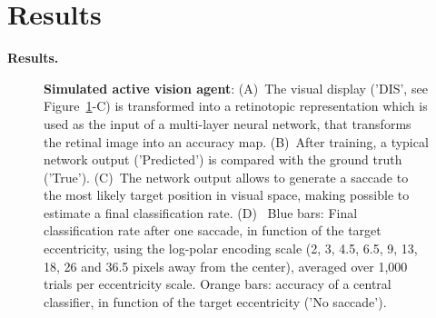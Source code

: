 \CNS
\section{Results}
\label{sec:results}
\else
\textbf{Results. }
\fi
\begin{figure}%
\caption{
{\bf Simulated active vision agent}: 
(A)~The visual display ('DIS', see  Figure~\ref{fig:results}-C)  is transformed into a retinotopic representation which is used as the input of a multi-layer neural network, that transforms the retinal image into an accuracy map. (B)~After training, a typical network output  ('Predicted') is compared  with the ground truth ('True'). (C)~The network output allows to generate a saccade to the most likely target position in visual space, making possible to estimate a final classification rate. (D)~ Blue bars: Final classification rate after one saccade, in function of the target eccentricity, using the log-polar encoding scale (2, 3, 4.5, 6.5, 9, 13, 18, 26 and 36.5 pixels away from the center), averaged over 1,000 trials per eccentricity scale. Orange bars: accuracy of a central classifier, in function of the target eccentricity ('No saccade').
\label{fig:results}}%
\end{figure}%

